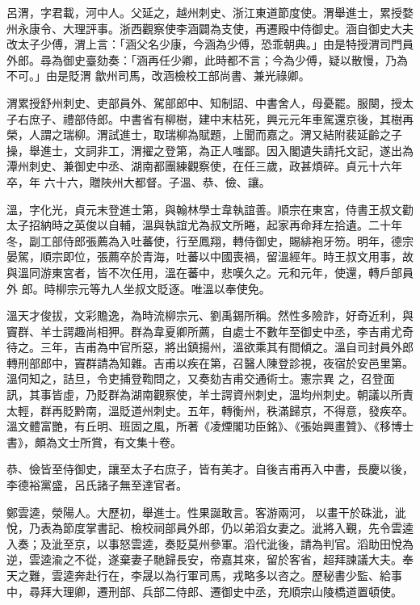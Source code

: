 \begin{pinyinscope}
 呂渭，字君載，河中人。父延之，越州刺史、浙江東道節度使。渭舉進士，累授婺州永康令、大理評事。浙西觀察使李涵闢為支使，再遷殿中侍御史。涵自御史大夫改太子少傅，渭上言：「涵父名少康，今涵為少傅，恐乖朝典。」由是特授渭司門員外郎。尋為御史臺劾奏：「涵再任少卿，此時都不言；今為少傅，疑以散慢，乃為不可。」由是貶渭
 歙州司馬，改涵檢校工部尚書、兼光祿卿。



 渭累授舒州刺史、吏部員外、駕部郎中、知制詔、中書舍人，母憂罷。服闋，授太子右庶子、禮部侍郎。中書省有柳樹，建中末枯死，興元元年車駕還京後，其樹再榮，人謂之瑞柳。渭試進士，取瑞柳為賦題，上聞而嘉之。渭又結附裴延齡之子操，舉進士，文詞非工，渭擢之登第，為正人嗤鄙。因入閣遺失請托文記，遂出為潭州刺史、兼御史中丞、湖南都團練觀察使，在任三歲，政甚煩碎。貞元十六年卒，年
 六十六，贈陜州大都督。子溫、恭、儉、讓。



 溫，字化光，貞元末登進士第，與翰林學士韋執誼善。順宗在東宮，侍書王叔文勸太子招納時之英俊以自輔，溫與執誼尤為叔文所睠，起家再命拜左拾遺。二十年冬，副工部侍郎張薦為入吐蕃使，行至鳳翔，轉侍御史，賜緋袍牙笏。明年，德宗晏駕，順宗即位，張薦卒於青海，吐蕃以中國喪禍，留溫經年。時王叔文用事，故與溫同游東宮者，皆不次任用，溫在蕃中，悲嘆久之。元和元年，使還，轉戶部員外
 郎。時柳宗元等九人坐叔文貶逐。唯溫以奉使免。



 溫天才俊拔，文彩贍逸，為時流柳宗元、劉禹錫所稱。然性多險詐，好奇近利，與竇群、羊士諤趣尚相狎。群為韋夏卿所薦，自處士不數年至御史中丞，李吉甫尤奇待之。三年，吉甫為中官所惡，將出鎮揚州，溫欲乘其有間傾之。溫自司封員外郎轉刑部郎中，竇群請為知雜。吉甫以疾在第，召醫人陳登診視，夜宿於安邑里第。溫伺知之，詰旦，令吏捕登鞫問之，又奏劾吉甫交通術士。憲宗異
 之，召登面訊，其事皆虛，乃貶群為湖南觀察使，羊士諤資州刺史，溫均州刺史。朝議以所責太輕，群再貶黔南，溫貶道州刺史。五年，轉衡州，秩滿歸京，不得意，發疾卒。溫文體富艷，有丘明、班固之風，所著《凌煙閣功臣銘》、《張始興畫贊》、《移博士書》，頗為文士所賞，有文集十卷。



 恭、儉皆至侍御史，讓至太子右庶子，皆有美才。自後吉甫再入中書，長慶以後，李德裕黨盛，呂氏諸子無至達官者。



 鄭雲逵，滎陽人。大歷初，舉進士。性果誕敢言。客游兩河，
 以畫干於硃泚，泚悅，乃表為節度掌書記、檢校祠部員外郎，仍以弟滔女妻之。泚將入覲，先令雲逵入奏；及泚至京，以事怒雲逵，奏貶莫州參軍。滔代泚後，請為判官。滔助田悅為逆，雲逵渝之不從，遂棄妻子馳歸長安，帝嘉其來，留於客省，超拜諫議大夫。奉天之難，雲逵奔赴行在，李晟以為行軍司馬，戎略多以咨之。歷秘書少監、給事中，尋拜大理卿，遷刑部、兵部二侍郎、遷御史中丞，充順宗山陵橋道置頓使。




\end{pinyinscope}
